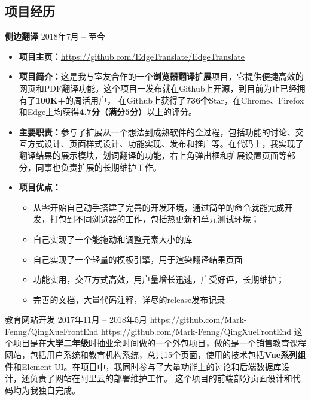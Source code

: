 \documentclass[10pt]{article} %
\begin{document}
\begin{paracol}{2}

\section{项目经历}


{\large{\textbf{侧边翻译}}} \hfill \textsc{2018年7月 -- 至今} %
	\begin{itemize}
		\item \textbf{项目主页：}\href{https://github.com/EdgeTranslate/EdgeTranslate}{\small{https://github.com/EdgeTranslate/EdgeTranslate}} %
		\item \textbf{项目简介：}{这是我与室友合作的一个\textbf{浏览器翻译扩展}项目，它提供便捷高效的网页和PDF翻译功能。这个项目一发布就在Github上开源，到目前为止已经拥有了\textbf{100K+}的周活用户，
		在Github上获得了\textbf{736个}Star，在Chrome、Firefox和Edge上均获得\textbf{4.7分（满分5分）}以上的评分。} %
		\item \textbf{主要职责：}{参与了扩展从一个想法到成熟软件的全过程，包括功能的讨论、交互方式设计、页面样式设计、功能实现、发布和推广等。在代码上，我实现了翻译结果的展示模块，划词翻译的功能，右上角弹出框和扩展设置页面等部分，同事也负责扩展的长期维护工作。} %
		\item \textbf{项目优点：}{
			\begin{itemize}			
			\item 从零开始自己动手搭建了完善的开发环境，通过简单的命令就能完成开发，打包到不同浏览器的工作，包括热更新和单元测试环境；
			\item 自己实现了一个能拖动和调整元素大小的库
			\item 自己实现了一个轻量的模板引擎，用于渲染翻译结果页面
			\item 功能实用，交互方式高效，用户量增长迅速，广受好评，长期维护；
			\item 完善的文档，大量代码注释，详尽的release发布记录
		\end{itemize}} %
	\end{itemize}


\projectentry
{教育网站开发}
{2017年11月 -- 2018年5月}
{https://github.com/Mark-Fenng/QingXueFrontEnd}
{https://github.com/Mark-Fenng/QingXueFrontEnd}
{这个项目是在\textbf{大学二年级}时抽业余时间做的一个外包项目，做的是一个销售教育课程网站，包括用户系统和教育机构系统，总共15个页面，使用的技术包括\textbf{Vue系列组件}和Element UI。在项目中，我同时参与了大量功能上的讨论和后端数据库设计，还负责了网站在阿里云的部署维护工作。} %
{这个项目的前端部分页面设计和代码均为我独自完成。} %


\end{paracol}
\end{document}
